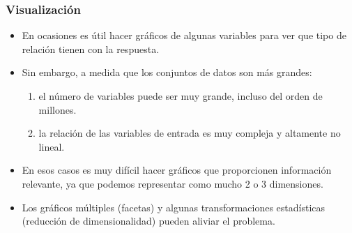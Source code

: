 \documentclass{beamer}
\begin{document}


\begin{frame}
\frametitle{Visualización}

\begin{itemize}
\item En ocasiones es útil hacer gráficos de algunas variables para ver que tipo de relación tienen con la respuesta.
\item Sin embargo, a medida que los conjuntos de datos son más grandes:
\begin{enumerate}
\item el número de variables puede ser muy grande, incluso del orden de millones.
\item la relación de las variables de entrada es muy compleja y altamente no lineal.
\end{enumerate}
\item En esos casos es muy difícil hacer gráficos que proporcionen información relevante, ya que podemos representar como mucho 2 o 3 dimensiones.
\item Los gráficos múltiples (facetas) y algunas transformaciones estadísticas (reducción de dimensionalidad) pueden aliviar el problema.
\end{itemize}
\end{frame}
\end{document}
